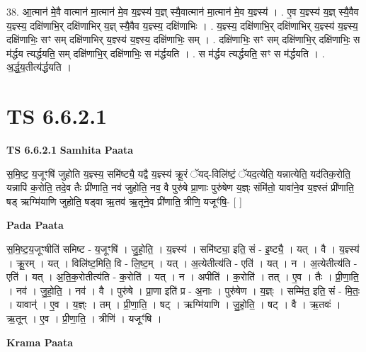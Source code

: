 \documentclass[17pt]{extarticle}
\begin{document}
38. आ॒त्मान॑ मे॒वै वात्मान॑ मा॒त्मान॑ मे॒व य॒ज्ञ्स्य॑ य॒ज्ञ् स्यै॒वात्मान॑ मा॒त्मान॑ मे॒व य॒ज्ञ्स्य॑ । . ए॒व य॒ज्ञ्स्य॑ य॒ज्ञ् स्यै॒वैव य॒ज्ञ्स्य॒ दक्षि॑णाभि॒र् दक्षि॑णाभिर् य॒ज्ञ् स्यै॒वैव य॒ज्ञ्स्य॒ दक्षि॑णाभिः । . य॒ज्ञ्स्य॒ दक्षि॑णाभि॒र् दक्षि॑णाभिर् य॒ज्ञ्स्य॑ य॒ज्ञ्स्य॒ दक्षि॑णाभिः॒ सꣳ सम् दक्षि॑णाभिर् य॒ज्ञ्स्य॑ य॒ज्ञ्स्य॒ दक्षि॑णाभिः॒ सम् । . दक्षि॑णाभिः॒ सꣳ सम् दक्षि॑णाभि॒र् दक्षि॑णाभिः॒ स म॑र्द्धय त्यर्द्धयति॒ सम् दक्षि॑णाभि॒र् दक्षि॑णाभिः॒ स म॑र्द्धयति । . स म॑र्द्धय त्यर्द्धयति॒ सꣳ स म॑र्द्धयति । . अ॒र्द्ध॒य॒तीत्य॑र्द्धयति । \newline
\pagebreak
{}

\section{ TS 6.6.2.1 }

\textbf{TS 6.6.2.1 } \newline
\textbf{Samhita Paata} \newline

स॒मि॒ष्ट॒ य॒जूꣳषि॑ जुहोति य॒ज्ञ्स्य॒ समि॑ष्ट्यै॒ यद्वै य॒ज्ञ्स्य॑ क्रू॒रं ॅयद्-विलि॑ष्टं॒ ॅयद॒त्येति॒ यन्नात्येति॒ यद॑तिक॒रोति॒ यन्नापि॑ क॒रोति॒ तदे॒व तैः प्री॑णाति॒ नव॑ जुहोति॒ नव॒ वै पुरु॑षे प्रा॒णाः पुरु॑षेण य॒ज्ञ्ः संमि॑तो॒ यावा॑ने॒व य॒ज्ञ्स्तं प्री॑णाति॒ षड् ऋग्मि॑याणि जुहोति॒ षड्वा ऋ॒तव॑ ऋ॒तूने॒व प्री॑णाति॒ त्रीणि॒ यजूꣳ॑षि॒- [  ] \newline

\textbf{Pada Paata} \newline

स॒मि॒ष्ट॒य॒जूꣳषीति॑ समिष्ट - य॒जूꣳषि॑ । जु॒हो॒ति॒ । य॒ज्ञ्स्य॑ । समि॑ष्ट्या॒ इति॒ सं - इ॒ष्ट्यै॒ । यत् । वै । य॒ज्ञ्स्य॑ । क्रू॒रम् । यत् । विलि॑ष्ट॒मिति॒ वि - लि॒ष्ट॒म् । यत् । अ॒त्येतीत्य॑ति - एति॑ । यत् । न । अ॒त्येतीत्य॑ति - एति॑ । यत् । अ॒ति॒क॒रोतीत्य॑ति - क॒रोति॑ । यत् । न । अपीति॑ । क॒रोति॑ । तत् । ए॒व । तैः । प्री॒णा॒ति॒ । नव॑ । जु॒हो॒ति॒ । नव॑ । वै । पुरु॑षे । प्रा॒णा इति॑ प्र - अ॒नाः । पुरु॑षेण । य॒ज्ञ्ः । सम्मि॑त॒ इति॒ सं - मि॒तः॒ । यावान्॑ । ए॒व । य॒ज्ञ्ः । तम् । प्री॒णा॒ति॒ । षट् । ऋग्मि॑याणि । जु॒हो॒ति॒ । षट् । वै । ऋ॒तवः॑ । ऋ॒तून् । ए॒व । प्री॒णा॒ति॒ । त्रीणि॑ । यजूꣳ॑षि ।  \newline


\textbf{Krama Paata} \newline
\end{document}
